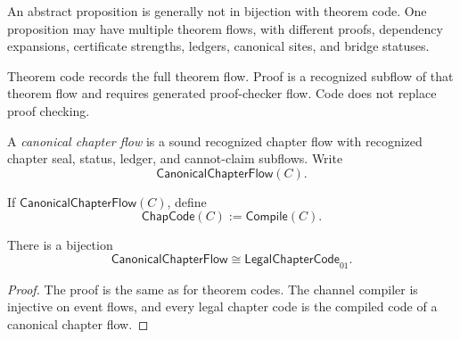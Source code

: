 \begin{corollary}
\label{cor:main-theorems-proposition-not-theorem-code}
An abstract proposition is generally not in bijection with theorem code. One proposition may have multiple theorem flows, with different proofs, dependency expansions, certificate strengths, ledgers, canonical sites, and bridge statuses.
\end{corollary}

\begin{corollary}
\label{cor:main-theorems-theorem-code-not-proof}
Theorem code records the full theorem flow. Proof is a recognized subflow of that theorem flow and requires generated proof-checker flow. Code does not replace proof checking.
\end{corollary}

\begin{definition}
\label{def:main-theorems-canonical-chapter-flow}
A \emph{canonical chapter flow} is a sound recognized chapter flow with recognized chapter seal, status, ledger, and cannot-claim subflows. Write
$$
  \mathsf{CanonicalChapterFlow}(C).
$$
\end{definition}

\begin{definition}
\label{def:main-theorems-chapter-code}
If $\mathsf{CanonicalChapterFlow}(C)$, define
$$
  \mathsf{ChapCode}(C):=\mathsf{Compile}(C).
$$
\end{definition}

\begin{theorem}
\label{thm:main-theorems-chapter-code-bijection}
There is a bijection
$$
  \boxed{
  \mathsf{CanonicalChapterFlow}
  \cong
  \mathsf{LegalChapterCode}_{01}.
  }
$$
\end{theorem}

\begin{proof}
The proof is the same as for theorem codes. The channel compiler is injective on event flows, and every legal chapter code is the compiled code of a canonical chapter flow.
\end{proof}

